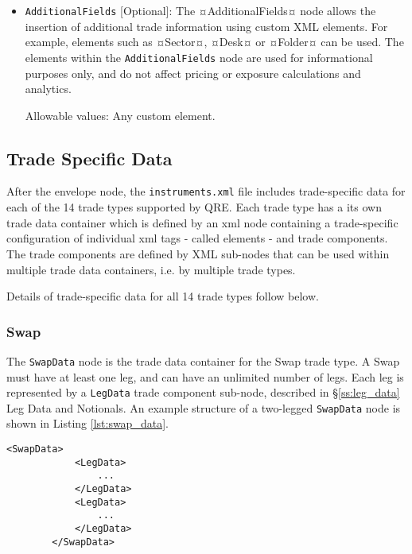 \begin{itemize}
\item \lstinline!AdditionalFields! [Optional]: The ¤AdditionalFields¤ node allows the insertion of additional trade information using custom XML elements.  For example, elements such as ¤Sector¤, ¤Desk¤ or ¤Folder¤ can be used. The elements within the \lstinline!AdditionalFields! node are used for informational purposes only, and do not affect pricing or exposure calculations and analytics.

Allowable values: Any custom element.

\end{itemize}

\subsection{Trade Specific Data}

After the envelope node, the {\tt instruments.xml} file includes trade-specific data for each of the 14 trade types supported by QRE. Each trade type has a its own trade data container which is defined by an xml node containing a trade-specific configuration of individual xml tags - called elements - and trade components. The  trade components are defined by XML sub-nodes that can be used within multiple trade data containers, i.e.  by multiple trade types.

\vspace{1em}

Details of  trade-specific data for all 14 trade types follow below.

\subsubsection{Swap}

The \lstinline!SwapData! node is the trade data container for the Swap trade type. A Swap must have at least one leg, and can have an unlimited number of legs. Each leg is represented by a \lstinline!LegData! trade component sub-node, described in \S \ref{ss:leg_data} Leg Data and Notionals. An example structure of a two-legged \lstinline!SwapData! node  is shown in Listing \ref{lst:swap_data}.

{\footnotesize
\begin{lstlisting}[caption=SwapData, label=lst:swap_data]
			 <SwapData>
            <LegData>
            	...
            </LegData>
            <LegData>
            	...
            </LegData>
        </SwapData>
\end{lstlisting}
}


